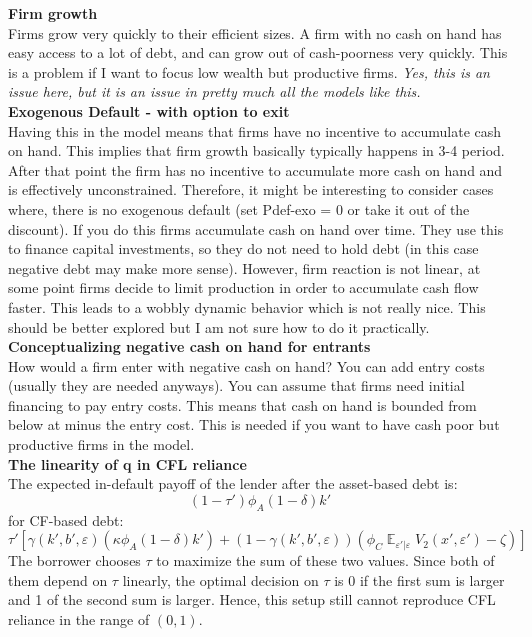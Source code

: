 \documentclass[12pt]{article}
\DeclareMathOperator{\E}{\mathbb{E}}
\begin{document}
\textbf{Firm growth} \\
Firms grow very quickly to their efficient sizes. A firm with no cash on hand has easy access to a lot of debt, and can grow out of cash-poorness very quickly. This is a problem if I want to focus low wealth but productive firms. \textit{Yes, this is an issue here, but it is an issue in pretty much all the models like this.} \vspace{3mm} \\
\textbf{Exogenous Default - with option to exit} \\
Having this in the model means that firms have no incentive to accumulate cash on hand. This implies that firm growth basically typically happens in 3-4 period. After that point the firm has no incentive to accumulate more cash on hand and is effectively unconstrained. Therefore, it might be interesting to consider cases where, there is no exogenous default (set Pdef-exo = 0 or take it out of the discount). If you do this firms accumulate cash on hand over time. They use this to finance capital investments, so they do not need to hold debt (in this case negative debt may make more sense). However, firm reaction is not linear, at some point firms decide to limit production in order to accumulate cash flow faster. This leads to a wobbly dynamic behavior which is not really nice. This should be better explored but I am not sure how to do it practically. \vspace{3mm} \\
\textbf{Conceptualizing negative cash on hand for entrants} \\ 
How would a firm enter with negative cash on hand? You can add entry costs (usually they are needed anyways). You can assume that firms need initial financing to pay entry costs. This means that cash on hand is bounded from below at minus the entry cost. This is needed if you want to have cash poor but productive firms in the model. \vspace{3mm} \\
\textbf{The linearity of q in CFL reliance} \\
The expected in-default payoff of the lender after the asset-based debt is: 
$$  (1-\tau') \phi_A (1-\delta) k'  $$
for CF-based debt: 
$$    \tau'\left[\gamma(k',b',\varepsilon)(\kappa \phi_A  (1-\delta) k') +  (1-\gamma(k',b',\varepsilon))\left( \phi_C \E_{\varepsilon'|\varepsilon}V_2 (x', \varepsilon') - \zeta \right) \right] $$
The borrower chooses $\tau$ to maximize the sum of these two values. Since both of them depend on $\tau$ linearly, the optimal decision on $\tau$ is 0 if the first sum is larger and 1 of the second sum is larger. Hence, this setup still cannot reproduce CFL reliance in the range of $(0,1)$. \vspace{3mm} \\
\end{document}
